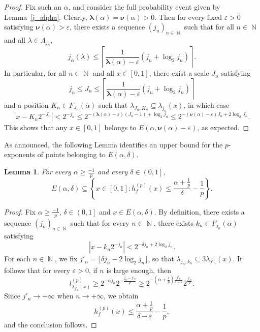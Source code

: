 \documentclass[a4paper,11pt,oneside]{article}
\DeclareMathOperator{\N}{\mathbb{N}}
\newcommand{\ccint}[1]{\left[{#1}\right]}
\newcommand{\ocint}[1]{\left({#1}\right]}
\newcommand{\modu}[1]{\left\vert{#1}\right\vert}
\theoremstyle{definition}
\theoremstyle{plain}
\newtheorem{lemma}[defi]{Lemma}
\begin{document}
\begin{proof}
Fix such an $\alpha$,
and consider the full probability event given by Lemma~\ref{j_alpha}. Clearly, \mbox{$\bm{\lambda}(\alpha)=\bm{\nu}(\alpha)>0$}. Then for every fixed $\varepsilon>0$ satisfying $\bm{\nu}(\alpha)>\varepsilon$, there exists a sequence $(j_n)_{n\in\N}$ such that for all $n\in\N$ and all $\lambda\in\Lambda_{j_n}$,
\[
j_\alpha(\lambda)\leq \left\lceil\frac{1}{\bm{\lambda}(\alpha)-\varepsilon}(j_n+\log_2j_n)\right\rceil.
\]
In particular, for all $n\in\N$ and all $x\in\ccint{0,1}$, there exist a scale $J_n$ satisfying
\[
j_n\leq J_n\leq \left\lceil\frac{1}{\bm{\lambda}(\alpha)-\varepsilon}(j_n+\log_2j_n)\right\rceil
\]
and a position $K_n\in F_{J_n}(\alpha)$ such that $\lambda_{J_n,K_n}\subseteq \lambda_{j_n}(x)$, in which case
\[
|x-K_n 2^{-J_n}|< 2^{-j_n} \leq 2^{-(\boldsymbol{\lambda}(\alpha) - \varepsilon)(J_n-1) + \log_2 j_n} \leq  2^{-(\boldsymbol{\nu}(\alpha) - \varepsilon)J_n + 2\log_2 J_n}.
\]
This shows that any $x\in\ccint{0,1}$ belongs to $E(\alpha,\bm{\nu}(\alpha)-\varepsilon)$, as expected.
\end{proof}

As announced, the following Lemma identifies an upper bound for the $p$-exponents of points belonging to $E(\alpha,\delta)$. 

\begin{lemma}\label{E_exp}
For every $\alpha\geq\frac{-1}{p}$ and every $\delta\in\ocint{0,1}$,
\[
E(\alpha,\delta)\subseteq \left\{x\in\ccint{0,1}:h^{(p)}_f(x)\leq \frac{\alpha+\frac{1}{p}}{\delta}-\frac{1}{p}\right\}.
\]
\end{lemma}

\begin{proof}
Fix $\alpha\geq\frac{-1}{p}$, $\delta\in\ocint{0,1}$ and $x\in E(\alpha,\delta)$. By definition, there exists a sequence $(j_n)_{n\in\N}$ such that for every $n\in\N$, there exists $k_n\in F_{j_n}(\alpha)$ satisfying 
\[
\modu{x-k_n2^{-j_n}}<2^{-\delta j_n+2\log_2j_n}.
\]
For each $n\in\N$, we fix $j'_n=\lfloor\delta j_n-2\log_2j_n\rfloor$, so that
$\lambda_{j_n,k_n}\subseteq 3\lambda_{j'_n}(x)$. 
It follows that for every $\varepsilon>0$, if $n$ is large enough, then
\[
l_{\lambda_{j'_n}(x)}^{(p)}\geq 2^{-\alpha j_n}2^{-\frac{j_n-j'_n}{p}}
\geq 2^{-\left(\alpha+\frac{1}{p}\right)\frac{j'_n}{\delta-\varepsilon}}2^{\frac{j'_n}{p}}.
\]
Since $j'_n\rightarrow+\infty$ when $n\rightarrow+\infty$, we obtain
\[
h_f^{(p)}(x)\leq \frac{\alpha+\frac{1}{p}}{\delta-\varepsilon}-\frac{1}{p},
\]
and the conclusion follows.
\end{proof}
\end{document}
